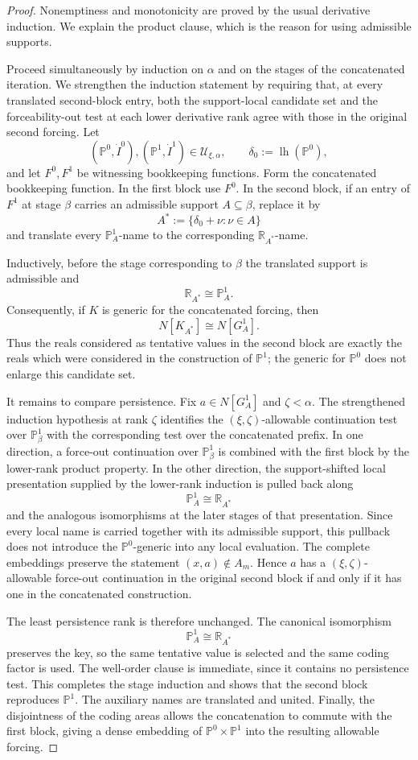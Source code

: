 \documentclass[a4paper,11pt]{article}
\newcommand{\forceP}{\mathbb{P}}
\newcommand{\forceR}{\mathbb{R}}
\begin{document}
\begin{proof}
Nonemptiness and monotonicity are proved by the usual derivative induction. We explain the product clause, which is the reason for using admissible supports.

Proceed simultaneously by induction on $\alpha$ and on the stages of the concatenated iteration. We strengthen the induction statement by requiring that, at every translated second-block entry, both the support-local candidate set and the forceability-out test at each lower derivative rank agree with those in the original second forcing. Let
\[
(\forceP^0,\dot I^0),(\forceP^1,\dot I^1)\in\mathcal U_{\xi,\alpha},
\qquad
\delta_0:=\operatorname{lh}(\forceP^0),
\]
and let $F^0,F^1$ be witnessing bookkeeping functions. Form the concatenated bookkeeping function. In the first block use $F^0$. In the second block, if an entry of $F^1$ at stage $\beta$ carries an admissible support $A\subseteq\beta$, replace it by
\[
A^*:=\{\delta_0+\nu:\nu\in A\}
\]
and translate every $\forceP^1_A$-name to the corresponding $\forceR_{A^*}$-name.

Inductively, before the stage corresponding to $\beta$ the translated support is admissible and
\[
\forceR_{A^*}\cong\forceP^1_A.
\]
Consequently, if $K$ is generic for the concatenated forcing, then
\[
N[K_{A^*}]\cong N[G^1_A].
\]
Thus the reals considered as tentative values in the second block are exactly the reals which were considered in the construction of $\forceP^1$; the generic for $\forceP^0$ does not enlarge this candidate set.

It remains to compare persistence. Fix $a\in N[G^1_A]$ and $\zeta<\alpha$. The strengthened induction hypothesis at rank $\zeta$ identifies the $(\xi,\zeta)$-allowable continuation test over $\forceP^1_\beta$ with the corresponding test over the concatenated prefix. In one direction, a force-out continuation over $\forceP^1_\beta$ is combined with the first block by the lower-rank product property. In the other direction, the support-shifted local presentation supplied by the lower-rank induction is pulled back along
\[
\forceP^1_A\cong\forceR_{A^*}
\]
and the analogous isomorphisms at the later stages of that presentation. Since every local name is carried together with its admissible support, this pullback does not introduce the $\forceP^0$-generic into any local evaluation. The complete embeddings preserve the statement $(x,a)\notin A_m$. Hence $a$ has a $(\xi,\zeta)$-allowable force-out continuation in the original second block if and only if it has one in the concatenated construction.

The least persistence rank is therefore unchanged. The canonical isomorphism
\[
\forceP^1_A\cong\forceR_{A^*}
\]
preserves the key, so the same tentative value is selected and the same coding factor is used. The well-order clause is immediate, since it contains no persistence test. This completes the stage induction and shows that the second block reproduces $\forceP^1$. The auxiliary names are translated and united. Finally, the disjointness of the coding areas allows the concatenation to commute with the first block, giving a dense embedding of $\forceP^0\times\forceP^1$ into the resulting allowable forcing.
\end{proof}
\end{document}
